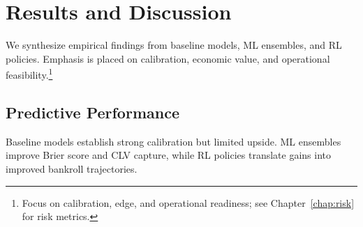 \chapter{Results and Discussion}
\label{chap:results}

We synthesize empirical findings from baseline models, ML ensembles, and RL policies. Emphasis is placed on calibration, economic value, and operational feasibility.\footnote{Focus on calibration, edge, and operational readiness; see Chapter~\ref{chap:risk} for risk metrics.}

\section{Predictive Performance}
Baseline models establish strong calibration but limited upside. ML ensembles improve Brier score and CLV capture, while RL policies translate gains into improved bankroll trajectories.


